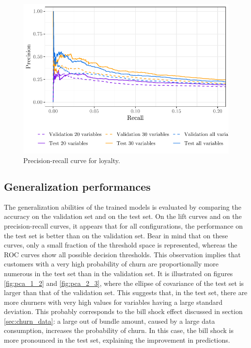\begin{figure}
    \centering
    \includegraphics[width=0.9\linewidth]{figures/pr_loy.pdf}
    \caption{Precision-recall curve for loyalty.}
    \label{fig:pr_loy}
\end{figure}

\subsection{Generalization performances}

The generalization abilities of the trained models is evaluated by comparing the
accuracy on the validation set and on the test set. On the lift curves and on
the precision-recall curves, it appears that for all configurations, the
performance on the test set is better than on the validation set. Bear in mind
that on these curves, only a small fraction of the threshold space is
represented, whereas the ROC curves show all possible decision thresholds. This
observation implies that customers with a very high probability of churn are
proportionally more numerous in the test set than in the validation set. It is
illustrated on figures \ref{fig:pca_1_2} and \ref{fig:pca_2_3}, where the
ellipse of covariance of the test set is larger than that of the validation set.
This suggests that, in the test set, there are more churners with very high
values for variables having a large standard deviation. This probably
corresponds to the bill shock effect discussed in section \ref{sec:churn_data}:
a large out of bundle amount, caused by a large data consumption, increases
the probability of churn. In this case, the bill shock is more pronounced in
the test set, explaining the improvement in predictions.

